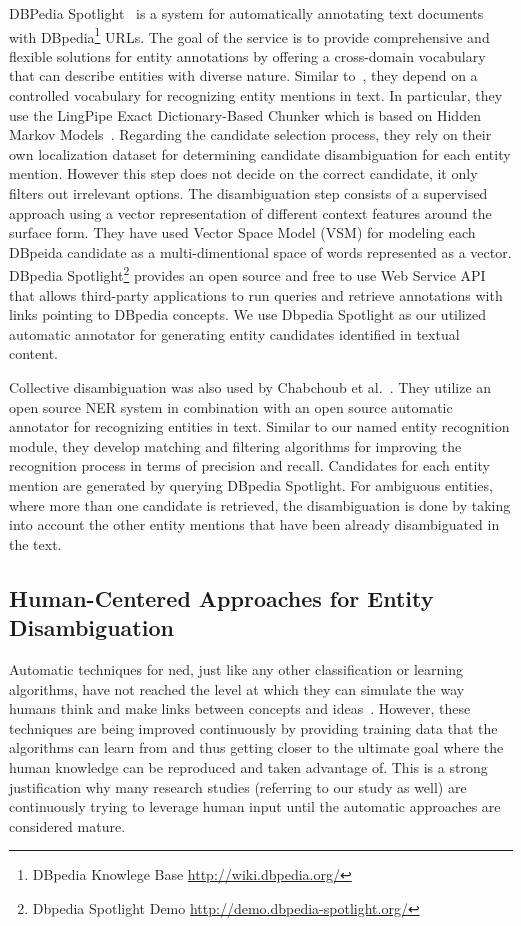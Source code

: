  DBPedia Spotlight~\cite{dbpedia} is a system for automatically annotating text documents with DBpedia\footnote{DBpedia Knowlege Base \url{http://wiki.dbpedia.org/}} URLs. The goal of the service is to provide comprehensive and flexible solutions for entity annotations by offering a cross-domain vocabulary that can describe entities with diverse nature. Similar to~\cite{6}, they depend on a controlled vocabulary for recognizing entity mentions in text. In particular, they use the LingPipe Exact Dictionary-Based Chunker which is based on Hidden Markov Models~\cite{dbpedia}. Regarding the candidate selection process, they rely on their own localization dataset for determining candidate disambiguation for each entity mention. However this step does not decide on the correct candidate, it only filters out irrelevant options. The disambiguation step consists of a supervised approach using a vector representation of different context features around the surface form. They have used Vector Space Model (VSM) for modeling each DBpeida candidate as a multi-dimentional space of words represented as a vector. DBpedia Spotlight\footnote{Dbpedia Spotlight Demo \url{http://demo.dbpedia-spotlight.org/}} provides an open source and free to use Web Service API that allows third-party applications to run queries and retrieve annotations with links pointing to DBpedia concepts. We use Dbpedia Spotlight as our utilized automatic annotator for generating entity candidates identified in textual content.
 
Collective disambiguation was also used by Chabchoub et al.~\cite{39}. They utilize an open source NER system in combination with an open source automatic annotator for recognizing entities in text. Similar to our named entity recognition module, they develop matching and filtering algorithms for improving the recognition process in terms of precision and recall. Candidates for each entity mention are generated by querying DBpedia Spotlight. For ambiguous entities, where more than one candidate is retrieved, the disambiguation is done by taking into account the other entity mentions that have been already disambiguated in the text.~\cite{39}

\subsection{Human-Centered Approaches for Entity Disambiguation}
\label{framework:relatedword_automatic}
Automatic techniques for \ac{ned}, just like any other classification or learning algorithms, have not reached the level at which they can simulate the way humans think and make links between concepts and ideas~\cite{sanderson1994,30}. However, these techniques are being improved continuously by providing training data that the algorithms can learn from and thus getting closer to the ultimate goal where the human knowledge can be reproduced and taken advantage of. This is a strong justification why many research studies (referring to our study as well) are continuously trying to leverage human input until the automatic approaches are considered mature. 

